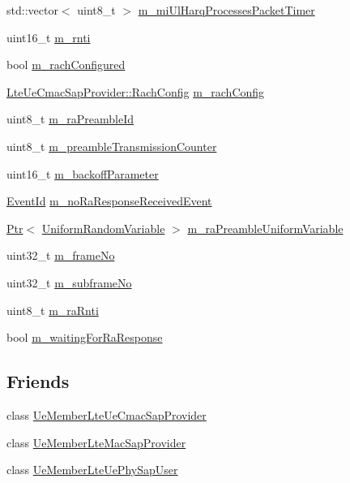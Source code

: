 \begin{DoxyCompactItemize}
\item 
std\+::vector$<$ uint8\+\_\+t $>$ \hyperlink{classns3_1_1LteUeMac_a1048d43c65abcd15c3e8623cd17b0d17}{m\+\_\+mi\+Ul\+Harq\+Processes\+Packet\+Timer}
\item 
uint16\+\_\+t \hyperlink{classns3_1_1LteUeMac_a95e386ad717fad6e09de8c139fe0ca89}{m\+\_\+rnti}
\item 
bool \hyperlink{classns3_1_1LteUeMac_a71cf0b8fceb9751e8a93b747767cd61c}{m\+\_\+rach\+Configured}
\item 
\hyperlink{structns3_1_1LteUeCmacSapProvider_1_1RachConfig}{Lte\+Ue\+Cmac\+Sap\+Provider\+::\+Rach\+Config} \hyperlink{classns3_1_1LteUeMac_a1a6d2781c296cc63bec0cb2b7759f61e}{m\+\_\+rach\+Config}
\item 
uint8\+\_\+t \hyperlink{classns3_1_1LteUeMac_a80808b971b1fb38d1d41ef34811a0252}{m\+\_\+ra\+Preamble\+Id}
\item 
uint8\+\_\+t \hyperlink{classns3_1_1LteUeMac_a57bcce66a456f91d8c14d800f5cca310}{m\+\_\+preamble\+Transmission\+Counter}
\item 
uint16\+\_\+t \hyperlink{classns3_1_1LteUeMac_aec40573a7f43b14aaca64cc8fc400695}{m\+\_\+backoff\+Parameter}
\item 
\hyperlink{classns3_1_1EventId}{Event\+Id} \hyperlink{classns3_1_1LteUeMac_a5240ec3060b71b9a55e406319d026869}{m\+\_\+no\+Ra\+Response\+Received\+Event}
\item 
\hyperlink{classns3_1_1Ptr}{Ptr}$<$ \hyperlink{classns3_1_1UniformRandomVariable}{Uniform\+Random\+Variable} $>$ \hyperlink{classns3_1_1LteUeMac_a5ecfebe20ea9f4a55feea440db8b7887}{m\+\_\+ra\+Preamble\+Uniform\+Variable}
\item 
uint32\+\_\+t \hyperlink{classns3_1_1LteUeMac_a1b315873647dfde83cc1907250db36d6}{m\+\_\+frame\+No}
\item 
uint32\+\_\+t \hyperlink{classns3_1_1LteUeMac_aa8e850f6c2066e50105036c39d52a584}{m\+\_\+subframe\+No}
\item 
uint8\+\_\+t \hyperlink{classns3_1_1LteUeMac_a00052ade9b3ba115e57d9cb491a4b06a}{m\+\_\+ra\+Rnti}
\item 
bool \hyperlink{classns3_1_1LteUeMac_ad31e6d5654f49c13d6f5614922e97288}{m\+\_\+waiting\+For\+Ra\+Response}
\end{DoxyCompactItemize}
\subsection*{Friends}
\begin{DoxyCompactItemize}
\item 
class \hyperlink{classns3_1_1LteUeMac_a89a2229e9fb66ebf25431c77f6c3281b}{Ue\+Member\+Lte\+Ue\+Cmac\+Sap\+Provider}
\item 
class \hyperlink{classns3_1_1LteUeMac_adba87581e10f8546f83131ba7accea69}{Ue\+Member\+Lte\+Mac\+Sap\+Provider}
\item 
class \hyperlink{classns3_1_1LteUeMac_a70d1cbf27364a07faa012ba5c1060cbd}{Ue\+Member\+Lte\+Ue\+Phy\+Sap\+User}
\end{DoxyCompactItemize}
